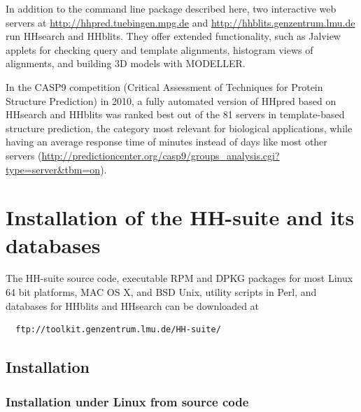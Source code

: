 \documentclass[11pt,a4paper]{article}
\begin{document}
In addition to the command line package described here, two interactive web servers at \url{http://hhpred.tuebingen.mpg.de} \cite{Soding:2005b, Hildebrand:2009} and \url{http://hhblits.genzentrum.lmu.de} run HHsearch and HHblits. They offer extended functionality, such as Jalview applets for checking query and template alignments, histogram views of alignments, and building 3D models with MODELLER. 

In the CASP9 competition (Critical Assessment of Techniques for Protein Structure Prediction) in 2010, a fully automated version of HHpred based on HHsearch and HHblits was ranked best out of the 81 servers in template-based structure prediction, the category most relevant for biological applications, while having an average response time of minutes instead of days like most other servers \cite{Mariani:2011} (\url{http://predictioncenter.org/casp9/groups_analysis.cgi?type=server&tbm=on}). 

\section{Installation of the HH-suite and its databases}

The HH-suite source code, executable RPM and DPKG packages for most Linux 64 bit platforms, MAC OS X, and BSD Unix, utility scripts in Perl, and databases for HHblits and HHsearch can be downloaded at
\begin{verbatim}
  ftp://toolkit.genzentrum.lmu.de/HH-suite/
\end{verbatim}


\subsection{Installation} \label{installation}

\subsubsection*{Installation under Linux from source code} 

\end{document}
